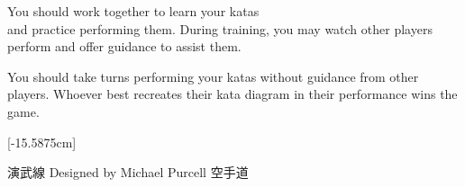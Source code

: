 \documentclass[landscape, a4paper, parskip=half, DIV=13]{scrartcl}
\begin{document}
\begin{center}
{\begin{description}[leftmargin=*]
\item[\textbf{Training}] You should work together to learn your katas\\and practice performing them. During training, you may watch other players perform and offer guidance to assist them.
\item[\textbf{Competition}] You should take turns performing your katas without guidance from other players. Whoever best recreates their kata diagram in their performance wins the game.
\end{description}
}[-15.5875cm]

\vfill

{\hspace*{1ex} {\setmainfont{Noto Sans JP}\Large 演武線} \hfill\LARGE Designed by Michael Purcell \hfill {\setmainfont{Noto Sans JP}\Large 空手道} \LARGE\hspace*{1.125ex}}
\normalmarginpar{}
\reversemarginpar{}
\end{center}
\end{document}
